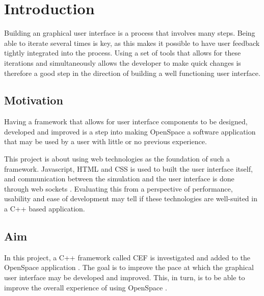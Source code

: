 \chapter{Introduction}
\label{cha:introduction}

Building an graphical user interface is a process that involves many steps.   Being able to iterate several times is key, as this makes it possible to have user feedback tightly integrated into the process. Using a set of tools that allows for these iterations and simultaneously allows the developer to make quick changes is therefore a good step in the direction of building a well functioning user interface.

\section{Motivation}
\label{sec:motivation}


Having a framework that allows for user interface components to be designed, developed and improved is a step into making OpenSpace  a software application that may be used by a user with little or no previous experience.

This project is about using web technologies as the foundation of such a framework. Javascript, HTML and CSS  is used to built the user interface itself, and communication between the simulation and the user interface is done through web sockets . Evaluating this from a perspective of performance, usability and ease of development may tell if these technologies are well-suited in a C++ based application.

\section{Aim}
\label{sec:aim}


In this project, a C++ framework called CEF is investigated and added to the OpenSpace application \cite{jossos}. The goal is to improve the pace at which the graphical user interface may be developed and improved. This, in turn, is to be able to improve the overall experience of using OpenSpace .

